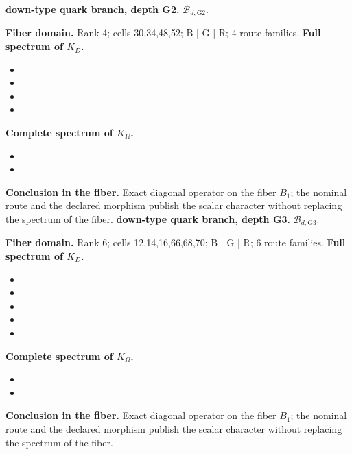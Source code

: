 \medskip
{}
\noindent\textbf{down-type quark branch, depth G2.} \(\mathcal B_{d,\mathrm{G2}}\).\par
\noindent\textbf{Fiber domain.} Rank 4; cells 30,34,48,52; B | G | R; 4 route families.
\noindent\textbf{Full spectrum of \(K_D\).}
\begin{itemize}
\item \texttt{}
\item \texttt{}
\item \texttt{}
\item \texttt{}
\end{itemize}
\noindent\textbf{Complete spectrum of \(K_\Omega\).}
\begin{itemize}
\item \texttt{}
\item \texttt{}
\end{itemize}
\noindent\textbf{Conclusion in the fiber.} Exact diagonal operator on the fiber \(B_1\); the nominal route and the declared morphism publish the scalar character without replacing the spectrum of the fiber.
\medskip
{}
\noindent\textbf{down-type quark branch, depth G3.} \(\mathcal B_{d,\mathrm{G3}}\).\par
\noindent\textbf{Fiber domain.} Rank 6; cells 12,14,16,66,68,70; B | G | R; 6 route families.
\noindent\textbf{Full spectrum of \(K_D\).}
\begin{itemize}
\item \texttt{}
\item \texttt{}
\item \texttt{}
\item \texttt{}
\item \texttt{}
\end{itemize}
\noindent\textbf{Complete spectrum of \(K_\Omega\).}
\begin{itemize}
\item \texttt{}
\item \texttt{}
\end{itemize}
\noindent\textbf{Conclusion in the fiber.} Exact diagonal operator on the fiber \(B_1\); the nominal route and the declared morphism publish the scalar character without replacing the spectrum of the fiber.
